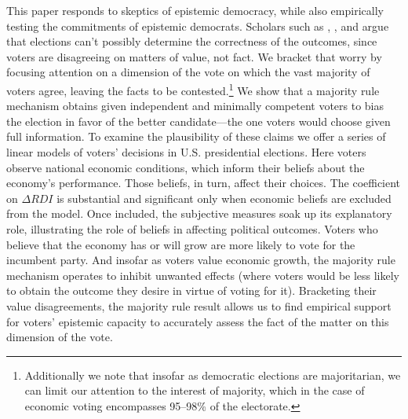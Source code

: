 \documentclass[11pt]{article}
\begin{document}
This paper responds to skeptics of epistemic democracy, while also empirically testing the commitments of epistemic democrats. Scholars such as \citet{Anderson2006}, \citet{Ingham2013}, and \cite{urbinati2014democracy} argue that elections can't possibly determine the correctness of the outcomes, since voters are disagreeing on matters of value, not fact. We bracket that worry by focusing attention on a dimension of the vote on which the vast majority of voters agree, leaving the facts to be contested.\footnote{Additionally we note that insofar as democratic elections are majoritarian, we can limit our attention to the interest of majority, which in the case of economic voting encompasses 95--98\% of the electorate.}
We show that a majority rule mechanism obtains given independent and minimally competent voters to bias the election in favor of the better candidate---the one voters would choose given full information.
To examine the plausibility of these claims we offer a series of linear models of voters' decisions in U.S. presidential elections. Here voters observe national economic conditions, which inform their beliefs about the economy's performance. Those beliefs, in turn, affect their choices. The coefficient on $\Delta RDI$  is substantial and significant only when economic beliefs are excluded from the model. Once included, the subjective measures soak up its explanatory role, illustrating the role of beliefs in affecting political outcomes. Voters who believe that the economy has or will grow are more likely to vote for the incumbent party. And insofar as voters value economic growth, the majority rule mechanism operates to inhibit unwanted effects (where voters would be less likely to obtain the outcome they desire in virtue of voting for it). 
Bracketing their value disagreements, the majority rule result allows us to find empirical support for voters' epistemic capacity to accurately assess the fact of the matter on this dimension of the vote. 

\end{document}
